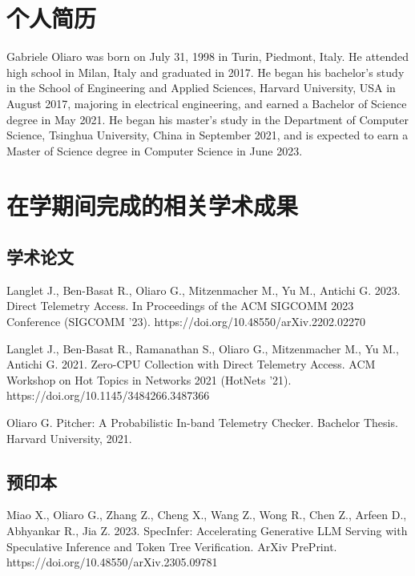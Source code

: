 
\begin{resume}

  \section*{个人简历}

  Gabriele Oliaro was born on July 31, 1998 in Turin, Piedmont, Italy. He attended high school in Milan, Italy and graduated in 2017. He began his bachelor’s study in the School of Engineering and Applied Sciences, Harvard University, USA in August 2017, majoring in electrical engineering, and earned a Bachelor of Science degree in May 2021. He began his master’s study in the Department of Computer Science, Tsinghua University, China in September 2021, and is expected to earn a Master of Science degree in Computer Science in June 2023.


  \section*{在学期间完成的相关学术成果}

  \subsection*{学术论文}

  \begin{achievements}
    \item Langlet J., Ben-Basat R., Oliaro G., Mitzenmacher M., Yu M., Antichi G. 2023. Direct Telemetry Access. In Proceedings of the ACM SIGCOMM 2023 Conference (SIGCOMM '23). https://doi.org/10.48550/arXiv.2202.02270
    \item Langlet J., Ben-Basat R., Ramanathan S., Oliaro G., Mitzenmacher M., Yu M., Antichi G. 2021. Zero-CPU Collection with Direct Telemetry Access. ACM Workshop on Hot Topics in Networks 2021 (HotNets '21). https://doi.org/10.1145/3484266.3487366
    \item Oliaro G. Pitcher: A Probabilistic In-band Telemetry Checker. Bachelor Thesis. Harvard University, 2021.
  \end{achievements}


  \subsection*{预印本}

  \begin{achievements}
    \item Miao X., Oliaro G., Zhang Z., Cheng X., Wang Z., Wong R., Chen Z., Arfeen D., Abhyankar R., Jia Z. 2023. SpecInfer: Accelerating Generative LLM Serving with Speculative Inference and Token Tree Verification. ArXiv PrePrint. https://doi.org/10.48550/arXiv.2305.09781

  \end{achievements}

\end{resume}
